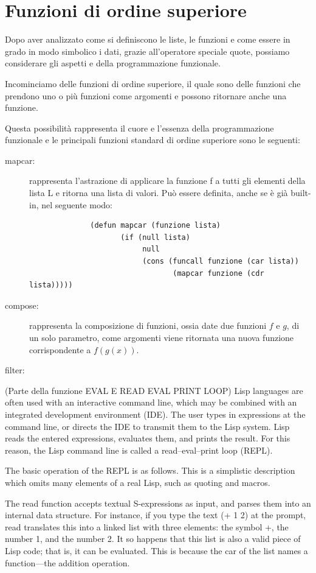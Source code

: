 \documentclass[a4paper]{book}
\begin{document}
\section{Funzioni di ordine superiore}
Dopo aver analizzato come si definiscono le liste, le funzioni e come essere in grado
in modo simbolico i dati, grazie all'operatore speciale quote, possiamo considerare
gli aspetti e  della programmazione funzionale.

Incominciamo delle funzioni di ordine superiore, il quale sono delle funzioni che
prendono uno o più funzioni come argomenti e possono ritornare anche una funzione.

Questa possibilità rappresenta il cuore e l'essenza della programmazione funzionale
e le principali funzioni standard di ordine superiore sono le seguenti:
\begin{description}
  \item [mapcar:] rappresenta l'astrazione di applicare la funzione f a tutti gli
         elementi della lista L e ritorna una lista di valori.
         Può essere definita, anche se è già built-in, nel seguente modo:
         \begin{verbatim}
              (defun mapcar (funzione lista)
                     (if (null lista)
                          null
                          (cons (funcall funzione (car lista))
                                 (mapcar funzione (cdr lista)))))
         \end{verbatim}
  \item [compose:] rappresenta la composizione di funzioni, ossia date due funzioni
                   $f$ e $g$, di un solo parametro, come argomenti viene ritornata
                   una nuova funzione corrispondente a $f(g(x))$.
  \item [filter:]
\end{description}
(Parte della funzione EVAL E READ EVAL PRINT LOOP)
Lisp languages are often used with an interactive command line, which may be combined with an integrated development environment (IDE). The user types in expressions at the command line, or directs the IDE to transmit them to the Lisp system. Lisp reads the entered expressions, evaluates them, and prints the result. For this reason, the Lisp command line is called a read–eval–print loop (REPL).

The basic operation of the REPL is as follows. This is a simplistic description which omits many elements of a real Lisp, such as quoting and macros.

The read function accepts textual S-expressions as input, and parses them into an internal data structure. For instance, if you type the text (+ 1 2) at the prompt, read translates this into a linked list with three elements: the symbol +, the number 1, and the number 2. It so happens that this list is also a valid piece of Lisp code; that is, it can be evaluated. This is because the car of the list names a function—the addition operation.
\end{document}
